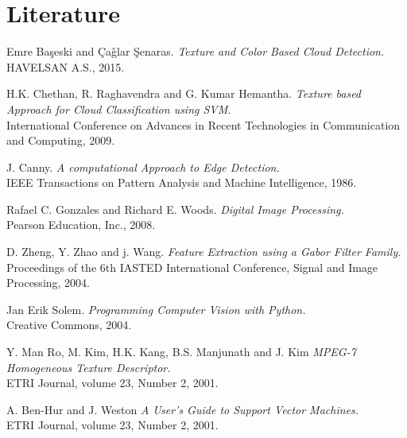 \documentclass{article}
\begin{document}
\newpage

\section{Literature}
\renewcommand{\section}[2]{}%
\begin{thebibliography}{9}

Emre Ba\c{s}eski and \c{C}a\v{g}lar \c{S}enaras. 
\textit{Texture and Color Based Cloud Detection.}
HAVELSAN A.S., 2015.
 
H.K. Chethan, R. Raghavendra and G. Kumar Hemantha. 
\textit{Texture based Approach for Cloud Classification using SVM.} \\
International Conference on Advances in Recent Technologies in Communication and Computing, 2009. 
 
J. Canny. 
\textit{A computational Approach to Edge Detection.} \\
IEEE Transactions on Pattern Analysis and Machine Intelligence, 1986. 
 
Rafael C. Gonzales and Richard E. Woods. 
\textit{Digital Image Processing.} \\
Pearson Education, Inc., 2008.
 
D. Zheng, Y. Zhao and j. Wang. 
\textit{Feature Extraction using a Gabor Filter Family.} \\
Proceedings of the 6th IASTED International Conference, Signal and Image Processing, 2004. 

Jan Erik Solem. 
\textit{Programming Computer Vision with Python.} \\
Creative Commons, 2004.

Y. Man Ro, M. Kim, H.K. Kang, B.S. Manjunath and J. Kim
\textit{MPEG-7 Homogeneous Texture Descriptor.} \\
ETRI Journal, volume 23, Number 2, 2001. 

A. Ben-Hur and J. Weston
\textit{A User's Guide to Support Vector Machines.} \\
ETRI Journal, volume 23, Number 2, 2001. 

\end{thebibliography}

%
\end{document}
